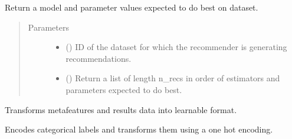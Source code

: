 \documentclass[letterpaper,10pt,english]{sphinxmanual}
\begin{document}
\begin{fulllineitems}
\begin{fulllineitems}
\label{\detokenize{index:ai.recommender.meta_recommender.MetaRecommender.recommend}}
Return a model and parameter values expected to do best on dataset.
\begin{quote}\begin{description}
\item[{Parameters}] \leavevmode\begin{itemize}
\item {} 
 () \textendash{} ID of the dataset for which the recommender is generating recommendations.

\item {} 
 (\sphinxstyleliteralemphasis{\sphinxupquote{ (}}\sphinxstyleliteralemphasis{\sphinxupquote{)}}\sphinxstyleliteralemphasis{\sphinxupquote{, }}) \textendash{} Return a list of length n\_recs in order of estimators and parameters expected to do best.

\end{itemize}

\end{description}\end{quote}

\end{fulllineitems}


\begin{fulllineitems}
\label{\detokenize{index:ai.recommender.meta_recommender.MetaRecommender.setup_training_data}}
Transforms metafeatures and results data into learnable format.

\end{fulllineitems}


\begin{fulllineitems}
\label{\detokenize{index:ai.recommender.meta_recommender.MetaRecommender.transform_ml_p}}
Encodes categorical labels and transforms them using a one hot encoding.


\end{fulllineitems}
\end{fulllineitems}
\end{document}
